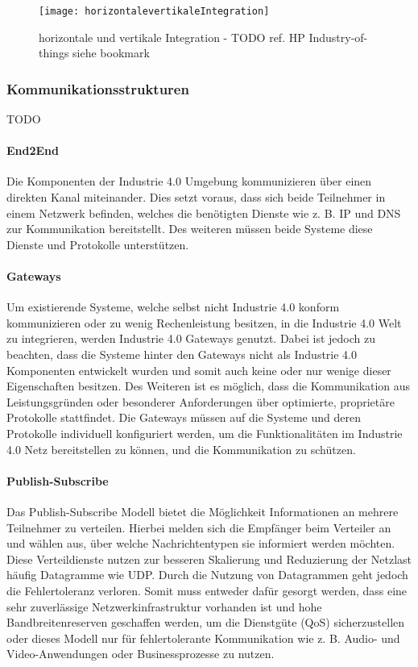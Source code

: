 \begin{figure}[h]
  \centering
  \texttt{[image: horizontalevertikaleIntegration]}
  \caption{horizontale und vertikale Integration - TODO ref. HP Industry-of-things siehe bookmark}
  \label{Kap2:horizontale und vertikale Integration}
\end{figure}

\clearpage

\subsubsection{Kommunikationsstrukturen}
\label{Grundlagen:Kommunikationsstrukturen}
TODO

\paragraph{End2End}
\label{Grundlagen:End2End}
Die Komponenten der Industrie 4.0 Umgebung kommunizieren über einen direkten Kanal miteinander. Dies setzt voraus, dass sich beide Teilnehmer in einem Netzwerk befinden, welches die benötigten Dienste wie z. B. \ac{IP} und \ac{DNS} zur Kommunikation bereitstellt. Des weiteren müssen beide Systeme diese Dienste und Protokolle unterstützen.

\paragraph{Gateways}
Um existierende Systeme, welche selbst nicht Industrie 4.0 konform kommunizieren oder zu wenig Rechenleistung besitzen, in die Industrie 4.0 Welt zu integrieren, werden Industrie 4.0 Gateways genutzt. Dabei ist jedoch zu beachten, dass die Systeme hinter den Gateways nicht als Industrie 4.0 Komponenten entwickelt wurden und somit auch keine oder nur wenige dieser Eigenschaften besitzen. Des Weiteren ist es möglich, dass die Kommunikation aus Leistungsgründen oder besonderer Anforderungen über optimierte, proprietäre Protokolle stattfindet. Die Gateways müssen auf die Systeme und deren Protokolle individuell konfiguriert werden, um die Funktionalitäten im Industrie 4.0 Netz bereitstellen zu können, und die Kommunikation zu schützen.

\paragraph{Publish-Subscribe}
\label{Grundlagen:Publish-Subscribe}
Das Publish-Subscribe Modell bietet die Möglichkeit Informationen an mehrere Teilnehmer zu verteilen. Hierbei melden sich die Empfänger beim Verteiler an und wählen aus, über welche Nachrichtentypen sie informiert werden möchten. Diese Verteildienste nutzen zur besseren Skalierung und Reduzierung der Netzlast häufig Datagramme wie \ac{UDP}. Durch die Nutzung von Datagrammen geht jedoch die Fehlertoleranz verloren. Somit muss entweder dafür gesorgt werden, dass eine sehr zuverlässige Netzwerkinfrastruktur vorhanden ist und hohe Bandbreitenreserven geschaffen werden, um die Dienstgüte (\ac{QoS}) sicherzustellen oder dieses Modell nur für fehlertolerante Kommunikation wie z. B. Audio- und Video-Anwendungen oder Businessprozesse zu nutzen. 


